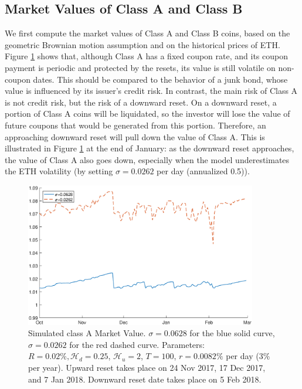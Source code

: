 \documentclass[draft, noinfoline]{ectaart}
\numberwithin{equation}{section}
\theoremstyle{plain}
\begin{document}
\subsection{Market Values of Class A and Class B}


We first compute the market values of Class A and Class B coins, based on the geometric Brownian motion assumption and on the historical prices of ETH. Figure \ref{fig:valA} shows that, although Class A has a fixed coupon rate, and its coupon payment is periodic and protected by the resets, its value is still volatile on non-coupon dates. This should be compared to the behavior of a junk bond, whose value is influenced by its issuer's credit risk. In contrast, the main risk of Class A is not credit risk, but the risk of a downward reset. On a downward reset, a portion of Class A coins will be liquidated, so the investor will lose the value of future coupons that would be generated from this portion. Therefore, an approaching downward reset will pull down the value of Class A. This is illustrated in Figure \ref{fig:valA} at the end of January: as the downward reset approaches, the value of Class A also goes down, especially when the model underestimates the ETH volatility (by setting $\sigma=0.0262$ per day (annualized 0.5)).

\begin{figure}[!htb]
\begin{centering}
\includegraphics[width=0.9\textwidth]{WA.eps}
\par\end{centering}
\caption{Simulated class A Market Value. $\sigma = 0.0628$ for the blue solid curve, $\sigma=0.0262$ for the red dashed curve. Parameters: $R=0.02\%,\mathcal{H}_{d}=0.25$, $\mathcal{H}_{u} =2$, $T=100$, $r=0.0082\%$ per day ($3\%$ per year). Upward reset takes place on 24 Nov 2017, 17 Dec 2017, and 7 Jan 2018. Downward reset date takes place on 5 Feb 2018.}\label{fig:valA}
\end{figure}
\end{document}
